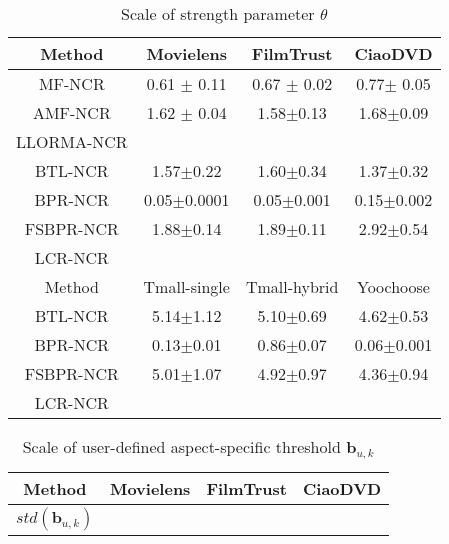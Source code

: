 \documentclass[letterpaper]{article} %
\begin{document}
\begin{table}[htp]
\caption{Scale of strength parameter $\theta$}
\begin{center}
\begin{tabular}{|c|c|c|c|}
\hline
Method & Movielens & FilmTrust & CiaoDVD \\\hline
MF-NCR &0.61 $\pm$ 0.11 &0.67 $\pm$ 0.02 &0.77$\pm$ 0.05 \\\hline
AMF-NCR &1.62 $\pm$ 0.04 &1.58$\pm$0.13 &1.68$\pm$0.09 \\\hline
LLORMA-NCR & & & \\\hline
BTL-NCR &1.57$\pm$0.22 &1.60$\pm$0.34 &1.37$\pm$0.32 \\\hline
BPR-NCR &0.05$\pm$0.0001 &0.05$\pm$0.001 &0.15$\pm$0.002 \\\hline
FSBPR-NCR &1.88$\pm$0.14 &1.89$\pm$0.11 &2.92$\pm$0.54 \\\hline
LCR-NCR & & & \\\hline
Method & Tmall-single & Tmall-hybrid & Yoochoose \\\hline
BTL-NCR &5.14$\pm$1.12 &5.10$\pm$0.69 &4.62$\pm$0.53 \\\hline
BPR-NCR &0.13$\pm$0.01 &0.86$\pm$0.07 &0.06$\pm$0.001 \\\hline
FSBPR-NCR &5.01$\pm$1.07 &4.92$\pm$0.97 &4.36$\pm$0.94 \\\hline
LCR-NCR & & & \\\hline
\end{tabular}
\end{center}
\label{tab:theta}
\end{table}%

\begin{table}[htp]
\caption{Scale of user-defined aspect-specific threshold $\mathbf{b}_{u,k}$}
\begin{center}
\begin{tabular}{|c|c|c|c|}
\hline
Method & Movielens & FilmTrust & CiaoDVD \\\hline
$std(\mathbf{b}_{u,k})$ & & & \\\hline
\end{tabular}
\end{center}
\label{tab:bias}
\end{table}%
\end{document}
